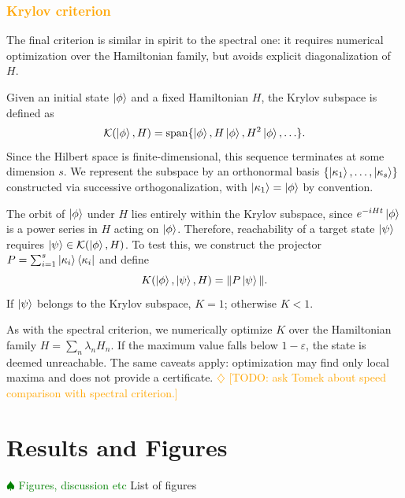 \documentclass[aps,prx,reprint,superscriptaddress,footnote, twocolumn,notitlepage]{revtex4-2}
\newcommand{\tom}[1]{\textcolor{green}{#1}}
\newcommand{\ko}[1]{\textcolor{orange}{#1}}
\newcommand{\todotom}[1]{\tom{$\spadesuit$ #1}}
\newcommand{\todoko}[1]{\ko{$\diamondsuit$ #1}}
\begin{document}
\subsubsection{\ko{Krylov criterion}}
The final criterion is similar in spirit to the spectral one: it requires numerical optimization over the Hamiltonian family, but avoids explicit diagonalization of $H$.

Given an initial state $\ket{\phi}$ and a fixed Hamiltonian $H$, the Krylov subspace is defined as
\begin{equation}
    \mathcal{K}(\ket{\phi}, H) = \mathrm{span}\{\ket{\phi}, H\ket{\phi}, H^2\ket{\phi}, \ldots\}.
\end{equation}
Since the Hilbert space is finite-dimensional, this sequence terminates at some dimension $s$. We represent the subspace by an orthonormal basis $\{\ket{\kappa_1}, \ldots, \ket{\kappa_s}\}$ constructed via successive orthogonalization, with $\ket{\kappa_1} = \ket{\phi}$ by convention.

The orbit of $\ket{\phi}$ under $H$ lies entirely within the Krylov subspace, since $e^{-iHt}\ket{\phi}$ is a power series in $H$ acting on $\ket{\phi}$. Therefore, reachability of a target state $\ket{\psi}$ requires $\ket{\psi} \in \mathcal{K}(\ket{\phi}, H)$. To test this, we construct the projector $P = \sum_{i=1}^{s} \ket{\kappa_i}\bra{\kappa_i}$ and define
\begin{equation}
    K(\ket{\phi}, \ket{\psi}, H) = \| P \ket{\psi} \|.
\end{equation}
If $\ket{\psi}$ belongs to the Krylov subspace, $K = 1$; otherwise $K < 1$.

As with the spectral criterion, we numerically optimize $K$ over the Hamiltonian family $H = \sum_n \lambda_n H_n$. If the maximum value falls below $1 - \varepsilon$, the state is deemed unreachable. The same caveats apply: optimization may find only local maxima and does not provide a certificate. \todoko{[TODO: ask Tomek about speed comparison with spectral criterion.]}

\section{{Results and Figures}}
\todotom{Figures, discussion etc}
List of figures
\end{document}

